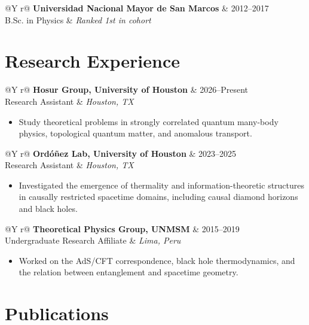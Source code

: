 \documentclass[10pt,a4paper]{article}
\makeatletter
\newcommand{\entry}[4]{%
  \begin{tabularx}{\textwidth}{@{}Y r@{}}
    \textbf{#1} & #2 \\
    #3 & \textit{#4}
  \end{tabularx}
}
\makeatother
\begin{document}
\entry{Universidad Nacional Mayor de San Marcos}{2012--2017}
{B.Sc. in Physics}{Ranked 1st in cohort}

\section{Research Experience}

\entry{Hosur Group, University of Houston}{2026--Present}
{Research Assistant}{Houston, TX}
\begin{itemize}
  \item Study theoretical problems in strongly correlated quantum many-body physics, topological quantum matter, and anomalous transport.
\end{itemize}

\entry{Ordóñez Lab, University of Houston}{2023--2025}
{Research Assistant}{Houston, TX}
\begin{itemize}
  \item Investigated the emergence of thermality and information-theoretic structures in causally restricted spacetime domains, including causal diamond horizons and black holes.
\end{itemize}

\entry{Theoretical Physics Group, UNMSM}{2015--2019}
{Undergraduate Research Affiliate}{Lima, Peru}
\begin{itemize}
  \item Worked on the AdS/CFT correspondence, black hole thermodynamics, and the relation between entanglement and spacetime geometry.
\end{itemize}

\section{Publications}
\end{document}
